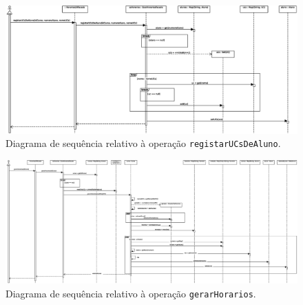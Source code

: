 \documentclass[12pt, a4paper]{article}
\begin{document}
\begin{landscape}
        \vspace*{\fill}
        \pagebreak
        \vspace*{\fill}

        \begin{figure}[H]
            \centering
            \includegraphics[scale=0.65]{Imagens/Modelos/registarUCsDeAluno.svg.eps}
            \caption{
                Diagrama de sequência relativo à operação \texttt{registarUCsDeAluno}.
            }
        \end{figure}

        \vspace*{\fill}
        \pagebreak
        \vspace*{\fill}

        \begin{figure}[H]
            \centering
            \includegraphics[scale=0.40]{Imagens/Modelos/gerarHorarios.svg.eps}
            \caption{
                Diagrama de sequência relativo à operação \texttt{gerarHorarios}.
            }
        \end{figure}

        \vspace*{\fill}
        \pagebreak
        \vspace*{\fill}


\end{landscape}
\end{document}
